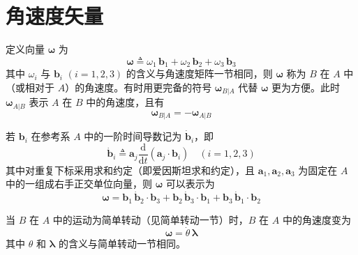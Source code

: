 \section{角速度矢量}\label{sec:angular-velocity-vector}
定义向量 $\bm{\omega}$ 为
\begin{equation}
    \bm{\omega} \triangleq \omega_1\,\mathbf{b}_1 + \omega_2\,\mathbf{b}_2 + \omega_3\,\mathbf{b}_3
    \label{eq:角速度矢量:定义}
\end{equation}
其中 $\omega_i$ 与 $\mathbf{b}_i$ $(i=1,2,3)$ 的含义与角速度矩阵一节相同，则 $\bm{\omega}$ 称为 $B$ 在 $A$ 中（或相对于 $A$）的角速度。有时用更完备的符号 $\bm{\omega}_{B|A}$ 代替 $\bm{\omega}$ 更为方便。此时 $\bm{\omega}_{A|B}$ 表示 $A$ 在 $B$ 中的角速度，且有
\begin{equation}
    \bm{\omega}_{B|A} = -\bm{\omega}_{A|B}
    \label{eq:角速度矢量:反对称性}
\end{equation}

若 $\mathbf{b}_i$ 在参考系 $A$ 中的一阶时间导数记为 $\dot{\mathbf{b}}_i$，即
\begin{equation}
    \dot{\mathbf{b}}_i \triangleq \mathbf{a}_j \frac{\mathrm{d}}{\mathrm{d}t}(\mathbf{a}_j\cdot\mathbf{b}_i)\quad(i=1,2,3)
    \label{eq:角速度矢量:单位矢导数}
\end{equation}
其中对重复下标采用求和约定（即‌爱因斯坦求和约定‌），且 $\mathbf{a}_1,\mathbf{a}_2,\mathbf{a}_3$ 为固定在 $A$ 中的一组成右手正交单位向量，则 $\bm{\omega}$ 可以表示为
\begin{equation}
    \bm{\omega} = \mathbf{b}_1\,\dot{\mathbf{b}}_2\cdot\mathbf{b}_3 + \mathbf{b}_2\,\dot{\mathbf{b}}_3\cdot\mathbf{b}_1 + \mathbf{b}_3\,\dot{\mathbf{b}}_1\cdot\mathbf{b}_2
    \label{eq:角速度矢量:基本关系}
\end{equation}

当 $B$ 在 $A$ 中的运动为简单转动（见简单转动一节）时，$B$ 在 $A$ 中的角速度变为
\begin{equation}
    \bm{\omega} = \dot{\theta}\,\bm{\lambda}
    \label{eq:角速度矢量:简单转动}
\end{equation}
其中 $\theta$ 和 $\bm{\lambda}$ 的含义与简单转动一节相同。

